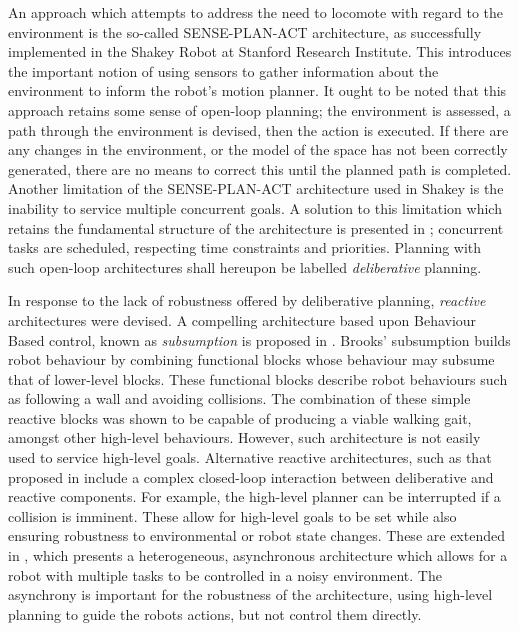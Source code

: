 An approach which attempts to address the need to locomote with regard to the environment is the so-called SENSE-PLAN-ACT architecture, as successfully implemented in the Shakey Robot at Stanford Research Institute\cite{shakey1968}. This introduces the important notion of using sensors to gather information about the environment to inform the robot's motion planner.  It ought to be noted that this approach retains some sense of open-loop planning; the environment is assessed, a path through the environment is devised, then the action is executed. If there are any changes in the environment, or the model of the space has not been correctly generated, there are no means to correct this until the planned path is completed. Another limitation of the SENSE-PLAN-ACT architecture used in Shakey is the inability to service multiple concurrent goals. A solution to this limitation which retains the fundamental structure of the architecture is presented in \cite{vere1983planning}; concurrent tasks are scheduled, respecting time constraints and priorities. Planning with such open-loop architectures shall hereupon be labelled \textit{deliberative} planning.

In response to the lack of robustness offered by deliberative planning, \textit{reactive} architectures were devised. A compelling architecture based upon Behaviour Based control, known as \textit{subsumption} is proposed in \cite{brooks1986robust}. Brooks' subsumption builds robot behaviour by combining functional blocks whose behaviour may subsume that of lower-level blocks. These functional blocks describe robot behaviours such as following a wall and avoiding collisions. The combination of these simple reactive blocks was shown to be capable of producing a viable walking gait, amongst other high-level behaviours. However, such architecture is not easily used to service high-level goals. Alternative reactive architectures, such as that proposed in \cite{georgeff1987reactive} include a complex closed-loop interaction between deliberative and reactive components. For example, the high-level planner can be interrupted if a collision is imminent. These allow for high-level goals to be set while also ensuring robustness to environmental or robot state changes. These are extended in \cite{gat1992integrating}, which presents a heterogeneous, asynchronous architecture which allows for a robot with multiple tasks to be controlled in a noisy environment. The asynchrony is important for the robustness of the architecture, using high-level planning to guide the robots actions, but not control them directly. 

